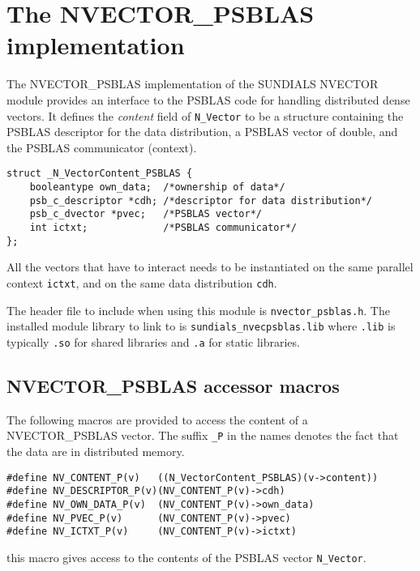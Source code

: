 \documentclass[twoside,a4paper]{refart}
\begin{document}
	
	\section{The NVECTOR\_PSBLAS implementation}\label{sec:nvector}
	The NVECTOR\_PSBLAS implementation of the SUNDIALS NVECTOR module provides an interface to the PSBLAS code for handling distributed dense vectors. 
	It defines the \emph{content} field of \texttt{N\_Vector} to be a structure containing the PSBLAS descriptor for the data distribution, a PSBLAS vector of double, and the PSBLAS communicator (context).
	
\begin{lstlisting}[style=CStyle]
struct _N_VectorContent_PSBLAS {
	booleantype own_data;  /*ownership of data*/
	psb_c_descriptor *cdh; /*descriptor for data distribution*/
	psb_c_dvector *pvec;   /*PSBLAS vector*/
	int ictxt;             /*PSBLAS communicator*/
};
\end{lstlisting}
	
	\attention All the vectors that have to interact needs to be instantiated on the same parallel context \lstinline[style=CStyle]|ictxt|, and on the same data distribution \lstinline[style=CStyle]|cdh|.
	
	
	The header file to include when using this module is \texttt{nvector\_psblas.h}. The installed module library to link to is \texttt{sundials\_nvecpsblas.lib} where \texttt{.lib} is typically \texttt{.so} for shared libraries and \texttt{.a} for static libraries.
	
	\subsection{NVECTOR\_PSBLAS accessor macros}
	
	The following macros are provided to access the content of a NVECTOR\_PSBLAS vector. The suffix \texttt{\_P} in the names denotes the fact that the data are in distributed memory.

\begin{lstlisting}[style=CStyle]
#define NV_CONTENT_P(v)   ((N_VectorContent_PSBLAS)(v->content))
#define NV_DESCRIPTOR_P(v)(NV_CONTENT_P(v)->cdh)
#define NV_OWN_DATA_P(v)  (NV_CONTENT_P(v)->own_data)
#define NV_PVEC_P(v)      (NV_CONTENT_P(v)->pvec)
#define NV_ICTXT_P(v)     (NV_CONTENT_P(v)->ictxt)
\end{lstlisting}

 this macro gives access to the contents of the PSBLAS vector \texttt{N\_Vector}.
\end{document}
